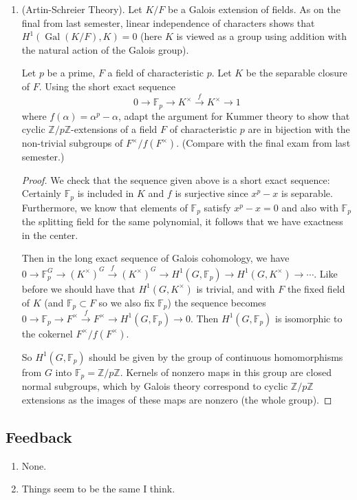\documentclass[11pt]{article}
\DeclareMathOperator{\Gal}{Gal}
\begin{document}
\begin{enumerate}
\begin{proof}
    \end{proof}
    \item (Artin-Schreier Theory). Let $K/F$ be a Galois extension of fields. As on the final from last semester, linear independence of characters shows that $H^1(\Gal(K/F),K) = 0$ (here $K$ is viewed as a group using addition with the natural action of the Galois group). 
    
    Let $p$ be a prime, $F$ a field of characteristic $p$. Let $K$ be the separable closure of $F$. Using the short exact sequence \[0\to \mathbb{F}_p\to K^\times\xrightarrow{f}K^\times\to 1\] where $f(\alpha) = \alpha^p-\alpha$, adapt the argument for Kummer theory to show that cyclic $\mathbb{Z}/p\mathbb{Z}$-extensions of a field $F$ of characteristic $p$ are in bijection with the non-trivial subgroups of $F^\times/f(F^\times)$. (Compare with the final exam from last semester.) \begin{proof}
        We check that the sequence given above is a short exact sequence: Certainly $\mathbb{F}_p$ is included in $K$ and $f$ is surjective since $x^p-x$ is separable. Furthermore, we know that elements of $\mathbb{F}_p$ satisfy $x^p-x = 0$ and also with $\mathbb{F}_p$ the splitting field for the same polynomial, it follows that we have exactness in the center. 

        Then in the long exact sequence of Galois cohomology, we have $0\to \mathbb{F}_p^G\to (K^\times)^G\xrightarrow{f}(K^\times)^G\to H^1(G,\mathbb{F}_p)\to H^1(G, K^\times) \to \cdots$. Like before we should have that $H^1(G, K^\times)$ is trivial, and with $F$ the fixed field of $K$ (and $\mathbb{F}_p\subset F$ so we also fix $\mathbb{F}_p$) the sequence becomes $0\to \mathbb{F}_p\to F^\times\xrightarrow{f}F^\times\to H^1(G,\mathbb{F}_p)\to 0$. Then $H^1(G,\mathbb{F}_p)$ is isomorphic to the cokernel $F^\times/f(F^\times)$. 

        So $H^1(G,\mathbb{F}_p)$ should be given by the group of continuous homomorphisms from $G$ into $\mathbb{F}_p = \mathbb{Z}/p\mathbb{Z}$. Kernels of nonzero maps in this group are closed normal subgroups, which by Galois theory correspond to cyclic $\mathbb{Z}/p\mathbb{Z}$ extensions as the images of these maps are nonzero (the whole group).
    \end{proof}
\end{enumerate}
\subsection*{Feedback}
\begin{enumerate}
    \item None.
    \item Things seem to be the same I think.
\end{enumerate}
\end{document}
